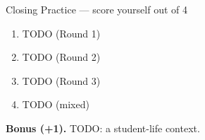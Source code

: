 
\boxguard[20]
\begin{notesbox}{Closing Practice --- score yourself out of 4}
\small
\begin{enumerate}[leftmargin=1.9em, itemsep=8pt]
  \item TODO (Round 1) 
  \item TODO (Round 2) 
  \item TODO (Round 3) 
  \item TODO (mixed) 
\end{enumerate}
\textbf{Bonus (+1).} TODO: a student-life context. 
\end{notesbox}



